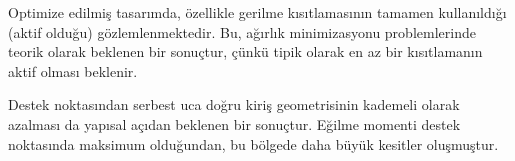 Optimize edilmiş tasarımda, özellikle gerilme kısıtlamasının tamamen kullanıldığı (aktif olduğu) gözlemlenmektedir. Bu, ağırlık minimizasyonu problemlerinde teorik olarak beklenen bir sonuçtur, çünkü tipik olarak en az bir kısıtlamanın aktif olması beklenir.

Destek noktasından serbest uca doğru kiriş geometrisinin kademeli olarak azalması da yapısal açıdan beklenen bir sonuçtur. Eğilme momenti destek noktasında maksimum olduğundan, bu bölgede daha büyük kesitler oluşmuştur.